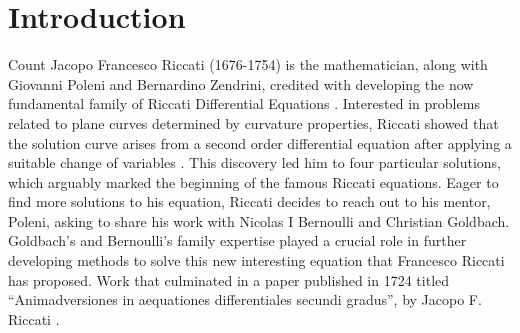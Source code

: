 \chapter{Introduction} Count Jacopo Francesco Riccati (1676-1754) is the mathematician, along with Giovanni Poleni and Bernardino Zendrini, credited with developing the now fundamental family of Riccati Differential Equations \cite{jungers_historical_2019}. Interested in problems related to plane curves determined by curvature properties, Riccati showed that the solution curve arises from a second order differential equation after applying a suitable change of variables \cite{riccati_soluzione_nodate}. This discovery led him to four particular solutions, which arguably marked the beginning of the famous Riccati equations. Eager to find more solutions to his equation, Riccati decides to reach out to his mentor, Poleni, asking to share his work with Nicolas I Bernoulli \cite{riccati_letter_1718} and Christian Goldbach. Goldbach’s and Bernoulli's family expertise played a crucial role in further developing methods to solve this new interesting equation that Francesco Riccati has proposed. Work that culminated in a paper published in 1724 titled “Animadversiones in aequationes differentiales secundi gradus”, by Jacopo F. Riccati \cite{riccati_animadversiones_1724}.
